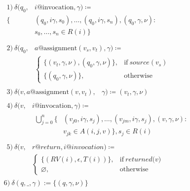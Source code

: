 \begin{equation}
    \label{fig:TransitionRelation}
    \begin{split}
        &\begin{split}
            1)\ \delta(q_0, & i@\textrm{invocation}, \gamma) \coloneqq \\
            \{& (q_0, i\gamma, s_0), \ldots, (q_0, i\gamma, s_n), (q_0, \gamma, \nu): \\
            & s_0, \ldots, s_n \in R(i)\} \\
        \end{split} \\
        &\begin{split}
            2)\ \delta(q_0, & a@\textrm{assignment} (v_s, v_t), \gamma) \coloneqq \\
            &\begin{cases}
                \{(v_t, \gamma, \nu), (q_0, \gamma, \nu)\},& \textrm{if}\ \textit{source}(v_s) \\
                \{(q_0, \gamma, \nu)\},& \textrm{otherwise}
            \end{cases}
        \end{split} \\
        &\begin{split}
            3)\ \delta(v, a@\textrm{assignment}(v, v_t), & \gamma) \coloneqq {(v_t, \gamma, \nu)}
        \end{split} \\
        &\begin{split}
            4)\ \delta(v, & i@\textrm{invocation}, \gamma) \coloneqq \\
            &\begin{split}
                \bigcup_{j=0}^{n} \{&(v_{j0}, i\gamma, s_j), \ldots, (v_{jm}, i\gamma, s_j), (v, \gamma, \nu): \\
                & v_{jk} \in A(i, j, v)\}, s_j \in R(i)
            \end{split}
        \end{split} \\
        &\begin{split}
            5)\ \delta(v, & r@return, i@invocation) \coloneqq \\
            &\begin{cases}
                \{(RV(i), \epsilon, T(i))\},& \textrm{if}\ \textit{returned(v)} \\
                \varnothing, & \textrm{otherwise}
            \end{cases}
        \end{split} \\
        & 6)\ \delta(q, \_, \gamma) := \{(q, \gamma, \nu)\}
    \end{split}
\end{equation}
